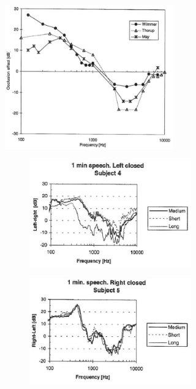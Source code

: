 \documentclass[dissertation,copyright]{uathesis}
\begin{document}
\begin{figure}
\begin{subfigure}{0.45\textwidth}
  \centering
  \includegraphics[width=0.8\textwidth]{figure/hansenAverageOE.png}
  \caption{ }
  \label{fig:hansenAverageOEa}
\end{subfigure}%
\hfill
\begin{subfigure}{0.5\textwidth}
  \begin{subfigure}{0.8\textwidth}
    \centering
    \includegraphics[width=1\textwidth]{figure/Hansen_OE-plot_a.png}
  \end{subfigure}
  \begin{subfigure}{0.8\textwidth}
    \centering
    \includegraphics[width=1\textwidth]{figure/Hansen_OE-plot_b.png}

\end{subfigure}
\end{subfigure}
\end{figure}
\end{document}
